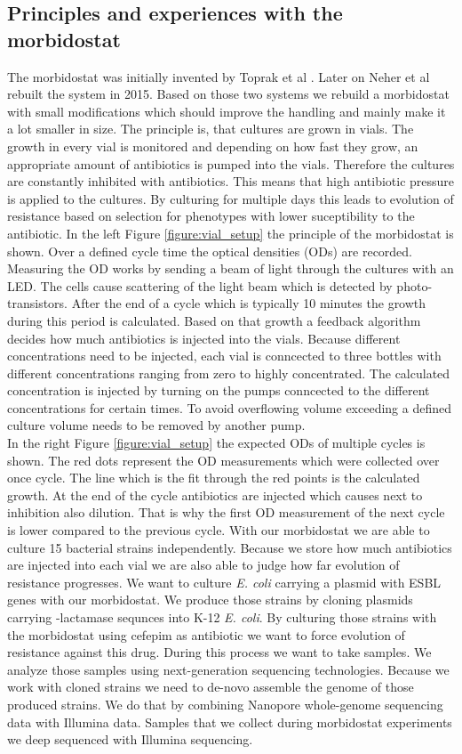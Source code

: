 \subsection{Principles and experiences with the morbidostat} 
The morbidostat was initially invented by Toprak et al \cite{morb_toprak}. Later on Neher et al \cite{doselmann_rapid_2017} rebuilt the system in 2015. Based on those two systems we rebuild a morbidostat with small modifications which should improve the handling and mainly make it a lot smaller in size. The principle is, that cultures are grown in vials. The growth in every vial is monitored and depending on how fast they grow, an appropriate amount of antibiotics is pumped into the vials. Therefore the cultures are constantly inhibited with antibiotics. This means that high antibiotic pressure is applied to the cultures. By culturing for multiple days this leads to evolution of resistance based on selection for phenotypes with lower suceptibility to the antibiotic.
In the left Figure \ref{figure:vial_setup} the principle of the morbidostat is shown. Over a defined cycle time the optical densities (ODs) are recorded. Measuring the OD works by sending a beam of light through the cultures with an LED. The cells cause scattering of the light beam which is detected by photo-transistors. After the end of a cycle which is typically 10 minutes the growth during this period is calculated. Based on that growth a feedback algorithm decides how much antibiotics is injected into the vials. Because different concentrations need to be injected, each vial is conncected to three bottles with different concentrations ranging from zero to highly concentrated. The calculated concentration is injected by turning on the pumps conncected to the different concentrations for certain times. To avoid overflowing volume exceeding a defined culture volume needs to be removed by another pump. \\
In the right Figure \ref{figure:vial_setup} the expected ODs of multiple cycles is shown. The red dots represent the OD measurements which were collected over once cycle. The line which is the fit through the red points is the calculated growth. At the end of the cycle antibiotics are injected which causes next to inhibition also dilution. That is why the first OD measurement of the next cycle is lower compared to the previous cycle.
With our morbidostat we are able to culture 15 bacterial strains independently. Because we store how much antibiotics are injected into each vial we are also able to judge how far evolution of resistance progresses. We want to culture \textit{E. coli} carrying a plasmid with ESBL genes with our morbidostat. We produce those strains by cloning plasmids carrying \textbeta-lactamase sequnces into K-12 \textit{E. coli}. By culturing those strains with the morbidostat using cefepim as antibiotic we want to force evolution of resistance against this drug. During this process we want to take samples. We analyze those samples using next-generation sequencing technologies. Because we work with cloned strains we need to de-novo assemble the genome of those produced strains. We do that by combining Nanopore whole-genome sequencing data with Illumina data. Samples that we collect during morbidostat experiments we deep sequenced with Illumina sequencing.
